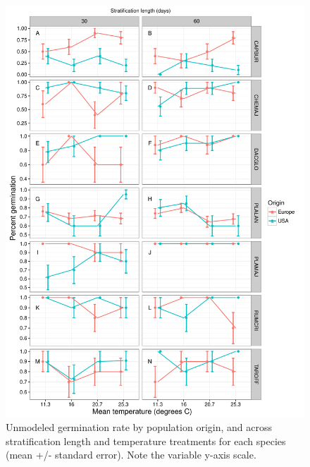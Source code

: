 \documentclass[12pt]{article}\usepackage[]{graphicx}\usepackage[]{color}
\begin{document}
\begin{figure}[H]
  \centering
  \includegraphics[scale=.9]{figure5} 
  \caption{Unmodeled germination rate by population origin, and across stratification length and temperature treatments for each species (mean +/- standard error). Note the variable y-axis scale.} \label{fig:rawrate}
\end{figure}
\end{document}
